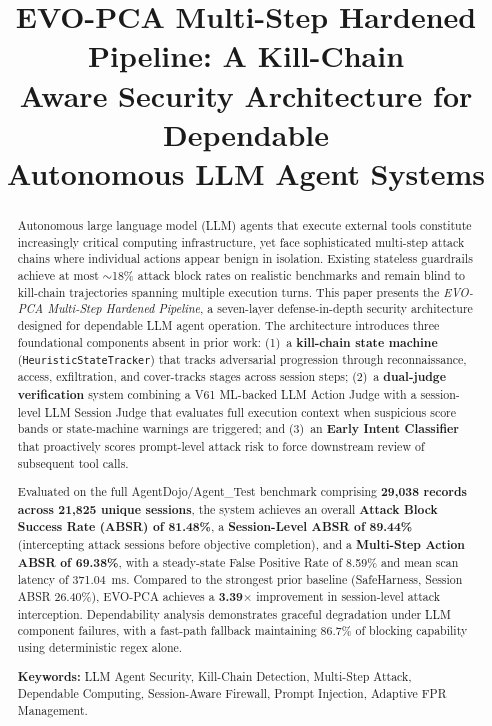 \documentclass[conference]{IEEEtran}
\begin{document}
\title{EVO-PCA Multi-Step Hardened Pipeline: A Kill-Chain\\Aware Security Architecture for Dependable\\Autonomous LLM Agent Systems}

\author{}

\maketitle

\begin{abstract}
Autonomous large language model (LLM) agents that execute external tools constitute increasingly critical computing infrastructure, yet face sophisticated multi-step attack chains where individual actions appear benign in isolation. Existing stateless guardrails achieve at most $\sim$18\% attack block rates on realistic benchmarks and remain blind to kill-chain trajectories spanning multiple execution turns. This paper presents the \textit{EVO-PCA Multi-Step Hardened Pipeline}, a seven-layer defense-in-depth security architecture designed for dependable LLM agent operation. The architecture introduces three foundational components absent in prior work: (1)~a \textbf{kill-chain state machine} (\texttt{HeuristicStateTracker}) that tracks adversarial progression through reconnaissance, access, exfiltration, and cover-tracks stages across session steps; (2)~a \textbf{dual-judge verification} system combining a V61 ML-backed LLM Action Judge with a session-level LLM Session Judge that evaluates full execution context when suspicious score bands or state-machine warnings are triggered; and (3)~an \textbf{Early Intent Classifier} that proactively scores prompt-level attack risk to force downstream review of subsequent tool calls.

Evaluated on the full AgentDojo/Agent\_Test benchmark comprising \textbf{29,038 records across 21,825 unique sessions}, the system achieves an overall \textbf{Attack Block Success Rate (ABSR) of 81.48\%}, a \textbf{Session-Level ABSR of 89.44\%} (intercepting attack sessions before objective completion), and a \textbf{Multi-Step Action ABSR of 69.38\%}, with a steady-state False Positive Rate of 8.59\% and mean scan latency of 371.04~ms. Compared to the strongest prior baseline (SafeHarness, Session ABSR 26.40\%), EVO-PCA achieves a \textbf{3.39$\times$} improvement in session-level attack interception. Dependability analysis demonstrates graceful degradation under LLM component failures, with a fast-path fallback maintaining 86.7\% of blocking capability using deterministic regex alone.

\textbf{Keywords:} LLM Agent Security, Kill-Chain Detection, Multi-Step Attack, Dependable Computing, Session-Aware Firewall, Prompt Injection, Adaptive FPR Management.
\end{abstract}
\end{document}
